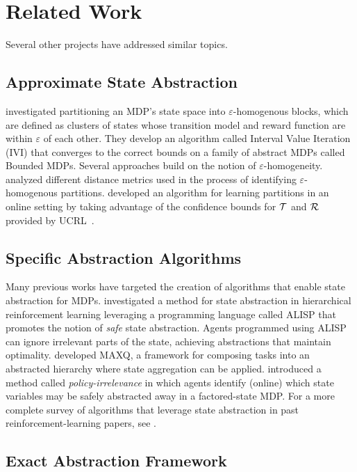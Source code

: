 \section{Related Work}

Several other projects have addressed similar topics.

\subsection{Approximate State Abstraction}
\citet{dean1997model} investigated partitioning an \ac{MDP}'s state space into $\varepsilon$-homogenous blocks, which are defined as clusters of states whose transition model and reward function are within $\varepsilon$ of each other. They develop an algorithm called Interval Value Iteration (IVI) that converges to the correct bounds on a family of abstract MDPs called Bounded \acp{MDP}. Several approaches build on the notion of $\varepsilon$-homogeneity. \citet{even2003approximate} analyzed different distance metrics used in the process of identifying $\varepsilon$-homogenous partitions. \citet{ortner2013adaptive} developed an algorithm for learning partitions in an online setting by taking advantage of the confidence bounds for $\mathcal{T}$ and $\mathcal{R}$ provided by UCRL~\cite{auer2009near}.

\subsection{Specific Abstraction Algorithms}
Many previous works have targeted the creation of algorithms that enable state abstraction for MDPs. \citet{andre2002state} investigated a method for state abstraction in hierarchical reinforcement learning leveraging a programming language called ALISP that promotes the notion of {\it safe} state abstraction. Agents programmed using ALISP can ignore irrelevant parts of the state, achieving abstractions that maintain optimality. \citet{dietterich2000hierarchical} developed MAXQ, a framework for composing tasks into an abstracted hierarchy where state aggregation can be applied. \citet{jong2005state} introduced a method called {\it policy-irrelevance} in which agents identify (online) which state variables may be safely abstracted away in a factored-state \ac{MDP}. For a more complete survey of algorithms that leverage state abstraction in past reinforcement-learning papers, see \citet{li2006towards}.

\subsection{Exact Abstraction Framework}


